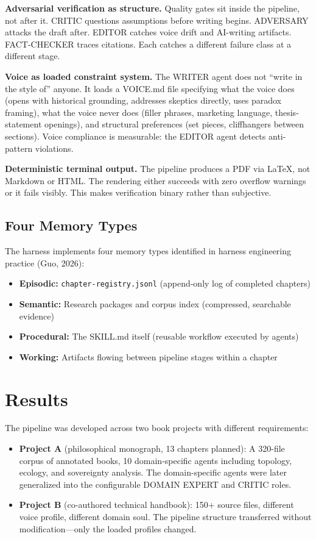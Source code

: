 \documentclass[11pt]{article}
\begin{document}
\textbf{Adversarial verification as structure.} Quality gates sit inside the pipeline,
not after it. CRITIC questions assumptions before writing begins. ADVERSARY attacks
the draft after. EDITOR catches voice drift and AI-writing artifacts. FACT-CHECKER
traces citations. Each catches a different failure class at a different stage.

\textbf{Voice as loaded constraint system.} The WRITER agent does not ``write in the
style of'' anyone. It loads a VOICE.md file specifying what the voice does (opens with
historical grounding, addresses skeptics directly, uses paradox framing), what the voice
never does (filler phrases, marketing language, thesis-statement openings), and structural
preferences (set pieces, cliffhangers between sections). Voice compliance is measurable:
the EDITOR agent detects anti-pattern violations.

\textbf{Deterministic terminal output.} The pipeline produces a PDF via LaTeX, not
Markdown or HTML. The rendering either succeeds with zero overflow warnings or it
fails visibly. This makes verification binary rather than subjective.

\subsection{Four Memory Types}

The harness implements four memory types identified in harness engineering practice (Guo, 2026):

\begin{itemize}[nosep]
  \item \textbf{Episodic:} \texttt{chapter-registry.jsonl} (append-only log of completed chapters)
  \item \textbf{Semantic:} Research packages and corpus index (compressed, searchable evidence)
  \item \textbf{Procedural:} The SKILL.md itself (reusable workflow executed by agents)
  \item \textbf{Working:} Artifacts flowing between pipeline stages within a chapter
\end{itemize}

\section{Results}

The pipeline was developed across two book projects with different requirements:

\begin{itemize}[nosep]
  \item \textbf{Project A} (philosophical monograph, 13 chapters planned): A 320-file
        corpus of annotated books, 10 domain-specific agents including topology,
        ecology, and sovereignty analysis. The domain-specific agents were later
        generalized into the configurable DOMAIN EXPERT and CRITIC roles.
  \item \textbf{Project B} (co-authored technical handbook):
        150+ source files, different voice profile, different domain soul. The
        pipeline structure transferred without modification---only the loaded
        profiles changed.
\end{itemize}
\end{document}
